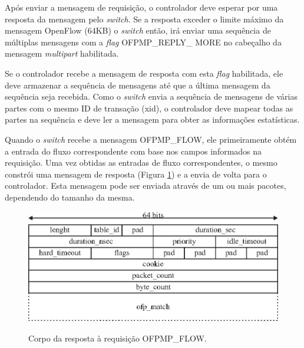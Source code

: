 Após enviar a mensagem de requisição, o controlador deve esperar por uma resposta da mensagem pelo \textit{switch}. Se a resposta exceder o limite máximo da mensagem OpenFlow (64KB) o \textit{switch} então, irá enviar uma sequência de múltiplas mensagens com a \textit{flag} OFPMP\_REPLY\_ MORE no cabeçalho da mensagem \textit{multipart} habilitada. 

Se o controlador recebe a mensagem de resposta com esta \textit{flag} habilitada, ele deve armazenar a sequência de mensagens até que a última mensagem da sequência seja recebida. Como o \textit{switch} envia a sequência de mensagens de várias partes com o mesmo ID de transação (xid), o controlador deve mapear todas as partes na sequência e deve ler a mensagem para obter as informações estatísticas.

Quando o \textit{switch} recebe a mensagem OFPMP\_FLOW, ele primeiramente obtém a entrada do fluxo correspondente com base nos campos informados na requisição. Uma vez obtidas as entradas de fluxo correspondentes, o mesmo constrói uma mensagem de resposta (Figura \ref{fig:ofp-flow-stats}) e a envia de volta para o controlador. Esta mensagem pode ser enviada através de um ou mais pacotes, dependendo do tamanho da mesma.

\begin{figure}[H]
  \centering
  \caption{Corpo da resposta à requisição OFPMP\_FLOW.}
  \includegraphics[width=.80\textwidth]{images/ofpmp-flow-stats.eps}
  \label{fig:ofp-flow-stats}
\end{figure}

